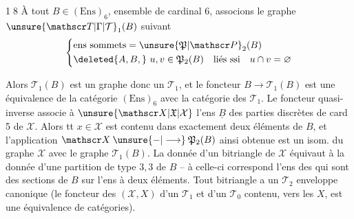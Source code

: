 \textcircled{18} À tout $B\in(\mathrm{Ens})_6$, ensemble de cardinal 6, associons le graphe $\unsure{\mathscr T|\Gamma|\mathcal T}_1(B)$ suivant
\[
\left\{\begin{aligned}
&\text{ens sommets}=\unsure{\mathfrak P|\mathscr P}_2(B)\\
&\deleted{A,B,}\ u,v\in\mathfrak P_2(B)\quad\text{liés ssi}\quad u\cap v=\varnothing
\end{aligned}\right.
\]

Alors $\mathscr T_1(B)$ est un graphe  donc un $\mathscr T_1$, et le foncteur $B\longrightarrow\mathscr T_1(B)$ est une équivalence de la catégorie $(\mathrm{Ens})_6$ avec la catégorie des $\mathscr T_1$. Le foncteur quasi-inverse associe à $\unsure{\mathscr X|\mathfrak X|\mathcal X}$ l'ens $\underline{B}$ des parties discrètes de card 5 de $\mathscr X$.
Alors tt $x\in\mathscr X$ est contenu dans exactement deux éléments de $B$, et l'application $\mathscr X\mathbin{\unsure{-|\longrightarrow}}\mathfrak P_2(B)$ ainsi obtenue est un isom. du graphe $\mathscr X$ avec le graphe $\mathscr T_1(B)$.
La donnée d'un bitriangle de $\mathscr X$ équivaut à la donnée d'une partition de type $3,3$ de $B$ -- à celle-ci correspond l'ens des   qui sont des sections de $B$ sur l'ens  à deux éléments.
Tout bitriangle a un $\mathscr T_2$ enveloppe canonique (le foncteur des $(\mathscr X,X)$ d'un $\mathscr T_1$ et d'un $\mathscr T_0$ contenu, vers les $X$, est une équivalence de catégories).


